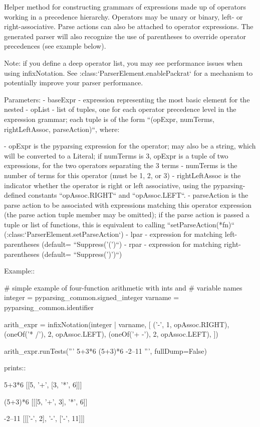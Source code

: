 \begin{DoxyVerb}Helper method for constructing grammars of expressions made up of
operators working in a precedence hierarchy.  Operators may be unary
or binary, left- or right-associative.  Parse actions can also be
attached to operator expressions. The generated parser will also
recognize the use of parentheses to override operator precedences
(see example below).

Note: if you define a deep operator list, you may see performance
issues when using infixNotation. See
:class:`ParserElement.enablePackrat` for a mechanism to potentially
improve your parser performance.

Parameters:
 - baseExpr - expression representing the most basic element for the
   nested
 - opList - list of tuples, one for each operator precedence level
   in the expression grammar; each tuple is of the form ``(opExpr,
   numTerms, rightLeftAssoc, parseAction)``, where:

   - opExpr is the pyparsing expression for the operator; may also
     be a string, which will be converted to a Literal; if numTerms
     is 3, opExpr is a tuple of two expressions, for the two
     operators separating the 3 terms
   - numTerms is the number of terms for this operator (must be 1,
     2, or 3)
   - rightLeftAssoc is the indicator whether the operator is right
     or left associative, using the pyparsing-defined constants
     ``opAssoc.RIGHT`` and ``opAssoc.LEFT``.
   - parseAction is the parse action to be associated with
     expressions matching this operator expression (the parse action
     tuple member may be omitted); if the parse action is passed
     a tuple or list of functions, this is equivalent to calling
     ``setParseAction(*fn)``
     (:class:`ParserElement.setParseAction`)
 - lpar - expression for matching left-parentheses
   (default= ``Suppress('(')``)
 - rpar - expression for matching right-parentheses
   (default= ``Suppress(')')``)

Example::

    # simple example of four-function arithmetic with ints and
    # variable names
    integer = pyparsing_common.signed_integer
    varname = pyparsing_common.identifier

    arith_expr = infixNotation(integer | varname,
        [
        ('-', 1, opAssoc.RIGHT),
        (oneOf('* /'), 2, opAssoc.LEFT),
        (oneOf('+ -'), 2, opAssoc.LEFT),
        ])

    arith_expr.runTests('''
        5+3*6
        (5+3)*6
        -2--11
        ''', fullDump=False)

prints::

    5+3*6
    [[5, '+', [3, '*', 6]]]

    (5+3)*6
    [[[5, '+', 3], '*', 6]]

    -2--11
    [[['-', 2], '-', ['-', 11]]]
\end{DoxyVerb}
 \mbox{\label{namespacepip_1_1__vendor_1_1pyparsing_a3552074303cfd44e5dd8e99f0a113b12}} 
